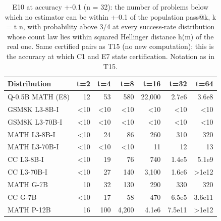 \begin{table}[t]
\centering
\small
\begin{tabular}{lrrrrrr}
\toprule
Distribution & t=2 & t=4 & t=8 & t=16 & t=32 & t=64 \\
\midrule
Q-0.5B MATH (E8) & 12 & 53 & 580 & 22,000 & 2.7e6 & 3.6e8 \\
GSM8K L3-8B-I & <10 & <10 & <10 & <10 & <10 & <10 \\
GSM8K L3-70B-I & <10 & <10 & <10 & <10 & <10 & <10 \\
MATH L3-8B-I & <10 & 24 & 86 & 260 & 310 & 320 \\
MATH L3-70B-I & <10 & <10 & <10 & 11 & 12 & 13 \\
CC L3-8B-I & <10 & 19 & 76 & 740 & 1.4e5 & 5.1e9 \\
CC L3-70B-I & <10 & 27 & 140 & 3,100 & 1.6e6 & >1e12 \\
MATH G-7B & 10 & 32 & 130 & 290 & 330 & 320 \\
CC G-7B & <10 & 17 & 58 & 470 & 6.5e5 & 3.6e11 \\
MATH P-12B & 16 & 100 & 4,200 & 4.1e6 & 7.5e11 & >1e12 \\
\bottomrule
\end{tabular}
\caption{E10 at accuracy +-0.1 (n = 32): the number of problems below which no estimator can be within +-0.1 of the population pass@k, k = t n, with probability above 3/4 at every success-rate distribution whose count law lies within squared Hellinger distance h(m) of the real one. Same certified pairs as T15 (no new computation); this is the accuracy at which C1 and E7 state certification. Notation as in T15.}
\label{tab:T15d_problems_needed_pm01}
\end{table}
